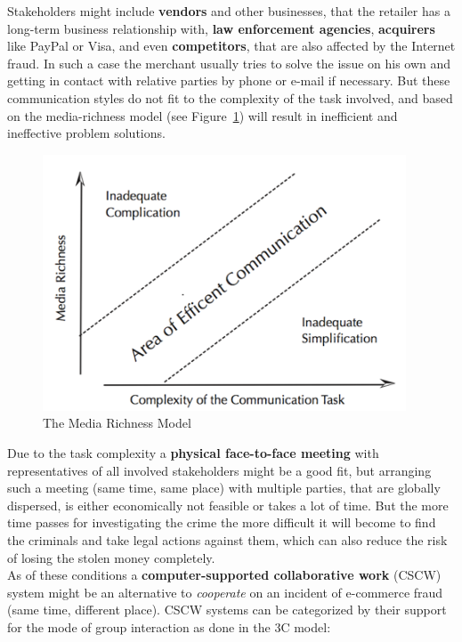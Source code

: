 Stakeholders might include \textbf{vendors} and other businesses, that the retailer has a long-term business relationship with, \textbf{law enforcement agencies}, \textbf{acquirers} like PayPal or Visa,
and even \textbf{competitors}, that are also affected by the Internet fraud. In such a case the merchant usually tries to solve the issue on his own and getting in contact with relative parties by phone or e-mail
if necessary. But these communication styles do not fit to the complexity of the task involved, and based on the media-richness model (see Figure~\ref{fig:images_media_richness_model}) will result in inefficient and ineffective problem solutions.
\\

\begin{figure}[!ht]
	\centering
		\includegraphics[height=3in]{images/media-richness-model.png}
	\caption{The Media Richness Model \citep{Stanford09}}
\label{fig:images_media_richness_model}
\end{figure}

Due to the task complexity a \textbf{physical face-to-face meeting} with representatives of all involved stakeholders might be a good fit, but arranging such a meeting (same time, same place) with multiple parties,
that are globally dispersed, is either economically not feasible or takes a lot of time. But the more time passes for investigating the crime the more difficult it will become to find the criminals and take legal actions against them,
which can also reduce the risk of losing the stolen money completely. \\

As of these conditions a \textbf{computer-supported collaborative work} (CSCW) system might be an alternative to \textit{cooperate} on an incident of e-commerce fraud (same time, different place).
CSCW systems can be categorized by their support for the mode of group interaction as done in the 3C model:

